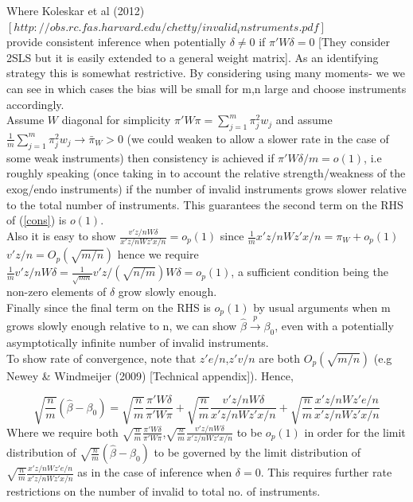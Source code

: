 \documentclass[11pt, fleqn]{article}
\begin{document}
Where Koleskar et al (2012) $[http://obs.rc.fas.harvard.edu/chetty/invalid_instruments.pdf]$\\
provide consistent inference when potentially $\delta\neq 0$ if $\pi'W\delta=0$ [They consider 2SLS but it is easily extended to a general weight matrix]. As an identifying strategy this is somewhat restrictive. By considering using many moments- we we can see in which cases the bias will be small for m,n large and choose instruments accordingly. \\


 Assume $W$ diagonal for simplicity $\pi'W\pi=\sum_{j=1}^m \pi_j^2w_j$ and assume $\frac{1}{m}\sum_{j=1}^m \pi_j^2w_j\rightarrow \bar{\pi}_W>0$ (we could weaken to allow a slower rate in the case of some weak instruments) then consistency is achieved if $\pi'W\delta/m=o(1)$, i.e roughly speaking (once taking in to account the relative strength/weakness of the exog/endo instruments) if the number of invalid instruments grows slower relative to the total number of instruments. This guarantees the second term on the RHS of (\ref{cons}) is $o(1)$.\\
 Also it is easy to show $\frac{v'z/nW\delta}{x'z/nWz'x/n}=o_p(1)$ since $\frac{1}{m}x'z/nWz'x/n=\pi_W+o_p(1)$ $v'z/n=O_p(\sqrt{m/n})$ hence we require $\frac{1}{m}v'z/nW\delta=\frac{1}{\sqrt{mn}} v'z/(\sqrt{n/m})W\delta=o_p(1)$, a sufficient condition being the non-zero elements of $\delta$ grow slowly enough.\\

Finally since the final term on the RHS is $o_p(1)$ by usual arguments when m grows slowly enough relative to n, we can show $\hat{\beta}\overset{p}{\rightarrow} \beta_0$, even with a potentially asymptotically infinite number of invalid instruments.\\
To show rate of convergence, note that $z'e/n$,$z'v/n$ are both $O_p(\sqrt{m/n})$ (e.g Newey \& Windmeijer (2009) [Technical appendix]). Hence,

\begin{equation} \label{limit}\sqrt{\frac{n}{m}} (\hat{\beta}-\beta_0)=  \sqrt{\frac{n}{m}} \frac{\pi'W\delta}{\pi'W\pi}+  \sqrt{\frac{n}{m}} \frac{v'z/nW\delta}{x'z/nWz'x/n}+ \sqrt{\frac{n}{m}} \frac{x'z/nWz'e/n}{x'z/nWz'x/n} \end{equation}
Where we require both $\sqrt{\frac{n}{m}} \frac{\pi'W\delta}{\pi'W\pi}$,$ \sqrt{\frac{n}{m}} \frac{v'z/nW\delta}{x'z/nWz'x/n}$ to be $o_p(1)$ in order for the limit distribution of $\sqrt{\frac{n}{m}} (\hat{\beta}-\beta_0)$ to be governed by the limit distribution of $ \sqrt{\frac{n}{m}} \frac{x'z/nWz'e/n}{x'z/nWz'x/n}$ as in the case of inference when $\delta=0$. This requires further rate restrictions on the number of invalid to total no. of instruments.\\
\end{document}
